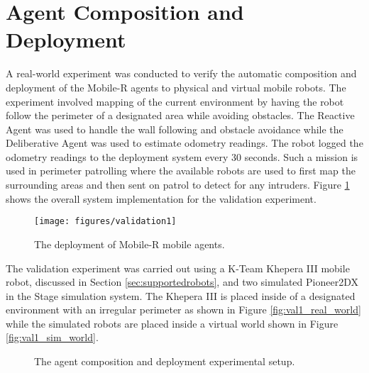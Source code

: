   \section{Agent Composition and Deployment}\label{sec:val_1}
    A real-world experiment was conducted to verify the automatic composition
      and deployment of the Mobile-R agents to physical and
      virtual mobile robots.
    The experiment involved mapping of the current environment by having the
      robot follow the perimeter of a designated area while avoiding obstacles.
    The Reactive Agent was used to handle the wall following and obstacle 
      avoidance while the Deliberative Agent was used to estimate odometry
      readings.
    The robot logged the odometry readings to the deployment system every 30 
      seconds.
    Such a mission is used in perimeter patrolling where the available robots 
      are used to first map the surrounding areas and then sent on patrol to 
      detect for any intruders.
    Figure \ref{fig:validation1} shows the overall system implementation for the 
      validation experiment.
    \begin{figure}%
      \centerline{\texttt{[image: figures/validation1]}}
      \caption{The deployment of Mobile-R mobile agents.}
      \label{fig:validation1}
    \end{figure}
    The validation experiment was carried out using a K-Team Khepera III mobile
      robot, discussed in Section \ref{sec:supportedrobots}, and two simulated
      Pioneer2DX in the Stage simulation system.
    The Khepera III is placed inside of a designated environment with an 
      irregular perimeter as shown in Figure \ref{fig:val1_real_world} while the 
      simulated robots are placed inside a virtual world shown in Figure
      \ref{fig:val1_sim_world}.
    \begin{figure}%
    \begin{center}
       \hspace{.5in}
    \caption{The agent composition and deployment experimental setup.}
    \label{fig:val1}
    \end{center}
    \end{figure}
